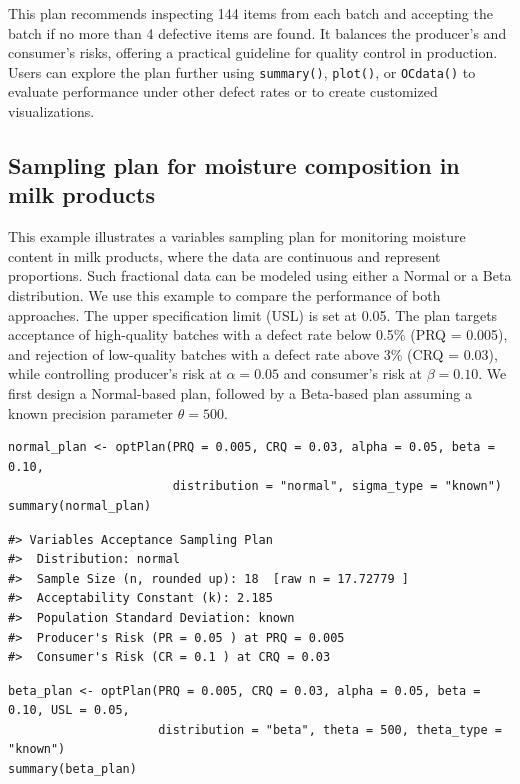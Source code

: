 This plan recommends inspecting 144 items from each batch and accepting the batch
if no more than 4 defective items are found. It balances the producer's and
consumer's risks, offering a practical guideline for quality control in production.
Users can explore the plan further using \texttt{summary()}, \texttt{plot()}, or
\texttt{OCdata()} to evaluate performance under other defect rates or to create
customized visualizations.

\subsection{Sampling plan for moisture composition in milk products}\label{subsec:moisture_exp}

This example illustrates a variables sampling plan for monitoring moisture content
in milk products, where the data are continuous and represent proportions. Such
fractional data can be modeled using either a Normal or a Beta distribution. We
use this example to compare the performance of both approaches. The upper
specification limit (USL) is set at 0.05. The plan targets acceptance of
high-quality batches with a defect rate below 0.5\% (PRQ = 0.005), and rejection
of low-quality batches with a defect rate above 3\% (CRQ = 0.03), while
controlling producer's risk at \(\alpha = 0.05\) and consumer's risk at
\(\beta = 0.10\). We first design a Normal-based plan, followed by a Beta-based
plan assuming a known precision parameter \(\theta = 500\).

\begin{verbatim}
normal_plan <- optPlan(PRQ = 0.005, CRQ = 0.03, alpha = 0.05, beta = 0.10, 
                       distribution = "normal", sigma_type = "known")
summary(normal_plan)
\end{verbatim}

\begin{verbatim}
#> Variables Acceptance Sampling Plan
#>  Distribution: normal 
#>  Sample Size (n, rounded up): 18  [raw n = 17.72779 ]
#>  Acceptability Constant (k): 2.185 
#>  Population Standard Deviation: known 
#>  Producer's Risk (PR = 0.05 ) at PRQ = 0.005 
#>  Consumer's Risk (CR = 0.1 ) at CRQ = 0.03
\end{verbatim}

\begin{verbatim}
beta_plan <- optPlan(PRQ = 0.005, CRQ = 0.03, alpha = 0.05, beta = 0.10, USL = 0.05,
                     distribution = "beta", theta = 500, theta_type = "known")
summary(beta_plan)
\end{verbatim}

